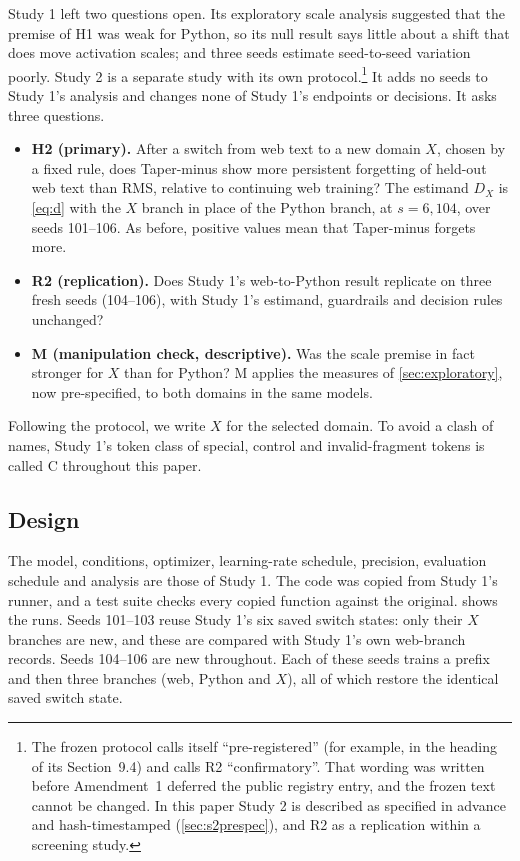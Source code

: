 \documentclass[11pt]{article}
\begin{document}
Study 1 left two questions open. Its exploratory scale analysis suggested that the premise of H1 was weak for
Python, so its null result says little about a shift that does move activation scales; and three seeds estimate
seed-to-seed variation poorly. Study 2 is a separate study with its own protocol.\footnote{The frozen protocol
calls itself ``pre-registered'' (for example, in the heading of its Section~9.4) and calls R2 ``confirmatory''.
That wording was written before Amendment~1 deferred the public registry entry, and the frozen text cannot be
changed. In this paper Study 2 is described as specified in advance and hash-timestamped
(\cref{sec:s2prespec}), and R2 as a replication within a screening study.} It adds no seeds to Study 1's
analysis and changes none of Study 1's endpoints or decisions. It asks three questions.
\begin{itemize}[leftmargin=1.4em,itemsep=2pt]
  \item \textbf{H2 (primary).} After a switch from web text to a new domain $X$, chosen by a fixed rule, does
        Taper-minus show more persistent forgetting of held-out web text than RMS, relative to continuing web
        training? The estimand $D_X$ is \cref{eq:d} with the $X$ branch in place of the Python branch, at
        $s = 6{,}104$, over seeds 101--106. As before, positive values mean that Taper-minus forgets more.
  \item \textbf{R2 (replication).} Does Study 1's web-to-Python result replicate on three fresh seeds (104--106),
        with Study 1's estimand, guardrails and decision rules unchanged?
  \item \textbf{M (manipulation check, descriptive).} Was the scale premise in fact stronger for $X$ than for
        Python? M applies the measures of \cref{sec:exploratory}, now pre-specified, to both domains in the same
        models.
\end{itemize}
Following the protocol, we write $X$ for the selected domain. To avoid a clash of names, Study 1's token class of
special, control and invalid-fragment tokens is called C throughout this paper.

\subsection{Design}
\label{sec:s2design}

The model, conditions, optimizer, learning-rate schedule, precision, evaluation schedule and analysis are those of
Study 1. The code was copied from Study 1's runner, and a test suite checks every copied function against the
original.  shows the runs. Seeds 101--103 reuse Study 1's six saved switch states: only their
$X$ branches are new, and these are compared with Study 1's own web-branch records. Seeds 104--106 are new
throughout. Each of these seeds trains a prefix and then three branches (web, Python and $X$), all of which restore
the identical saved switch state.
\end{document}
